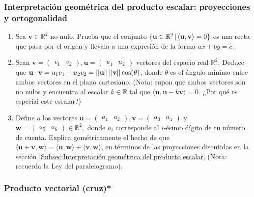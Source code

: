 \subsubsection{Interpretación geométrica del producto escalar: proyecciones y ortogonalidad}
\begin{enumerate}
\item Sea $\mathbf{v}\in\mathbb{R}^2$ no-nulo. Prueba que el conjunto $\{\mathbf{u}\in\mathbb{R}^2\hspace{0.5mm} |\hspace{0.5mm} \langle\mathbf{u},\mathbf{v}\rangle =0\}$ es una recta que pasa por el origen y llévala a una expresión de la forma $ax+by=c.$ 
    \item Sean $\mathbf{v}=\begin{pmatrix} v_1 & v_2 \end{pmatrix}, \mathbf{u}=\begin{pmatrix}u_1 & u_2 \end{pmatrix}$ vectores del espacio real $\mathbb{R}^2.$ Deduce que $\mathbf{u}\cdot\mathbf{v}=u_1v_1+u_2v_2=||\mathbf{u}||\hspace{0.5mm}||\mathbf{v}||\cos(\theta)$, donde $\theta$ es el ángulo mínimo entre ambos vectores en el plano cartesiano. (Nota: supon que ambos vectores son no nulos y encuentra al escalar $k\in\mathbb{R}$ tal que $\langle\mathbf{u},\mathbf{u}-k\mathbf{v}\rangle=0$. ¿Por qué es especial este escalar?) 
    \item Define a los vectores $\mathbf{u}=\begin{pmatrix} a_1 & a_2 \end{pmatrix}, \mathbf{v}=\begin{pmatrix} a_3 & a_4\end{pmatrix}$ y $\mathbf{w}=\begin{pmatrix} a_5 & a_6\end{pmatrix}\in\mathbb{R}^2,$ donde $a_i$ corresponde al $i$-ésimo dígito de tu número de cuenta. Explica gométricamente el hecho de que $\langle\mathbf{u}+\mathbf{v},\mathbf{w}\rangle=\langle\mathbf{u},\mathbf{w}\rangle+\langle\mathbf{v},\mathbf{w}\rangle$, en términos de las proyecciones discutidas en la sección \ref{Subsec:Interpretación geométrica del producto escalar} (Nota: recuerda la Ley del paralelogramo). 
\end{enumerate}

\subsubsection{Producto vectorial (cruz)*}

